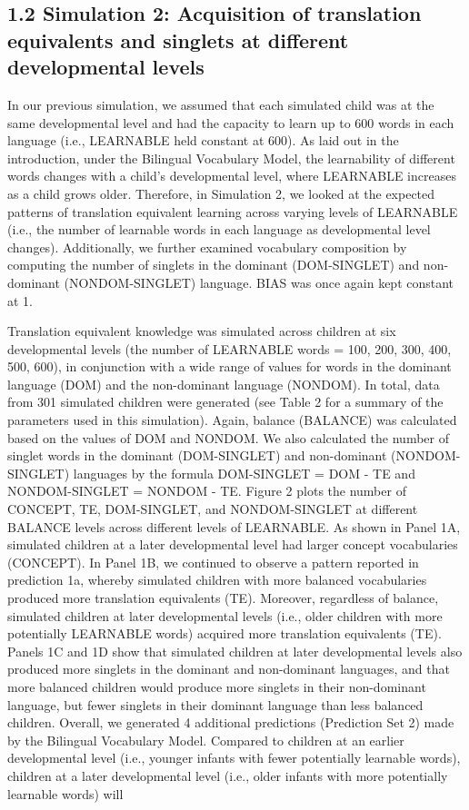 \documentclass[
  english,
  ,man,floatsintext]{apa6}
\begin{document}
\hypertarget{simulation-2-acquisition-of-translation-equivalents-and-singlets-at-different-developmental-levels}{%
\subsection{1.2 Simulation 2: Acquisition of translation equivalents and singlets at different developmental levels}\label{simulation-2-acquisition-of-translation-equivalents-and-singlets-at-different-developmental-levels}}

In our previous simulation, we assumed that each simulated child was at the same developmental level and had the capacity to learn up to 600 words in each language (i.e., LEARNABLE held constant at 600). As laid out in the introduction, under the Bilingual Vocabulary Model, the learnability of different words changes with a child's developmental level, where LEARNABLE increases as a child grows older. Therefore, in Simulation 2, we looked at the expected patterns of translation equivalent learning across varying levels of LEARNABLE (i.e., the number of learnable words in each language as developmental level changes). Additionally, we further examined vocabulary composition by computing the number of singlets in the dominant (DOM-SINGLET) and non-dominant (NONDOM-SINGLET) language. BIAS was once again kept constant at 1.

Translation equivalent knowledge was simulated across children at six developmental levels (the number of LEARNABLE words = 100, 200, 300, 400, 500, 600), in conjunction with a wide range of values for words in the dominant language (DOM) and the non-dominant language (NONDOM). In total, data from 301 simulated children were generated (see Table 2 for a summary of the parameters used in this simulation). Again, balance (BALANCE) was calculated based on the values of DOM and NONDOM. We also calculated the number of singlet words in the dominant (DOM-SINGLET) and non-dominant (NONDOM-SINGLET) languages by the formula DOM-SINGLET = DOM - TE and NONDOM-SINGLET = NONDOM - TE. Figure 2 plots the number of CONCEPT, TE, DOM-SINGLET, and NONDOM-SINGLET at different BALANCE levels across different levels of LEARNABLE. As shown in Panel 1A, simulated children at a later developmental level had larger concept vocabularies (CONCEPT). In Panel 1B, we continued to observe a pattern reported in prediction 1a, whereby simulated children with more balanced vocabularies produced more translation equivalents (TE). Moreover, regardless of balance, simulated children at later developmental levels (i.e., older children with more potentially LEARNABLE words) acquired more translation equivalents (TE). Panels 1C and 1D show that simulated children at later developmental levels also produced more singlets in the dominant and non-dominant languages, and that more balanced children would produce more singlets in their non-dominant language, but fewer singlets in their dominant language than less balanced children. Overall, we generated 4 additional predictions (Prediction Set 2) made by the Bilingual Vocabulary Model. Compared to children at an earlier developmental level (i.e., younger infants with fewer potentially learnable words), children at a later developmental level (i.e., older infants with more potentially learnable words) will
\end{document}
